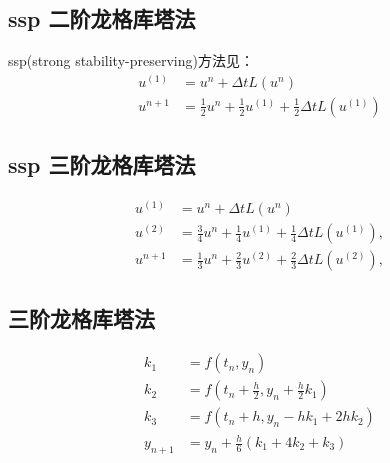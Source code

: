\documentclass{article}
\numberwithin{equation}{subsection}    %
\begin{document}
\begin{appendix}
    \subsection{ssp 二阶龙格库塔法}
    ssp(strong stability-preserving)方法见：\cite{RN96}
    \begin{equation}
        \begin{aligned}
            u^{(1)} & =u^{n}+\Delta t L\left(u^{n}\right)                                               \\
            u^{n+1} & =\frac{1}{2} u^{n}+\frac{1}{2} u^{(1)}+\frac{1}{2} \Delta t L\left(u^{(1)}\right)
        \end{aligned}
    \end{equation}
    \subsection{ssp 三阶龙格库塔法}
    \begin{equation}
        \begin{aligned}
            u^{(1)} & =u^{n}+\Delta t L\left(u^{n}\right)                                                \\
            u^{(2)} & =\frac{3}{4} u^{n}+\frac{1}{4} u^{(1)}+\frac{1}{4} \Delta t L\left(u^{(1)}\right), \\
            u^{n+1} & =\frac{1}{3} u^{n}+\frac{2}{3} u^{(2)}+\frac{2}{3} \Delta t L\left(u^{(2)}\right),
        \end{aligned}
    \end{equation}
    \subsection{三阶龙格库塔法}
    \begin{equation}
        \begin{aligned}
            k_1     & = f(t_n, y_n)                                \\
            k_2     & = f(t_n + \frac{h}{2}, y_n + \frac{h}{2}k_1) \\
            k_3     & = f(t_n + h, y_n - hk_1 + 2hk_2)             \\
            y_{n+1} & = y_n + \frac{h}{6}(k_1 + 4k_2 + k_3)        \\
        \end{aligned}
    \end{equation}


\end{appendix}
\end{document}

